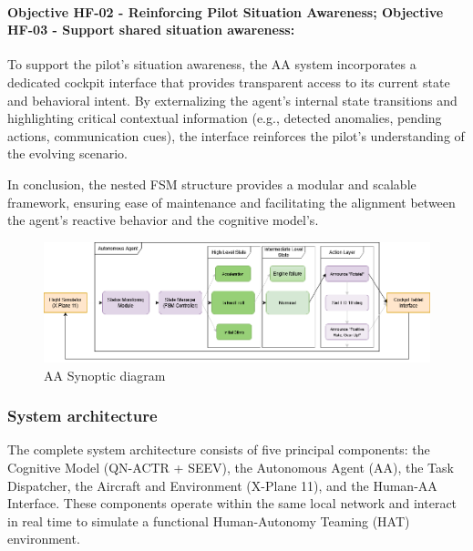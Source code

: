 \documentclass[12pt,a4paper]{article} %
\begin{document}
	\paragraph{Objective HF-02 - Reinforcing Pilot Situation Awareness; Objective HF-03 - Support shared situation awareness:}  
	To support the pilot's situation awareness, the AA system incorporates a dedicated cockpit interface that provides transparent access to its current state and behavioral intent. By externalizing the agent's internal state transitions and highlighting critical contextual information (e.g., detected anomalies, pending actions, communication cues), the interface reinforces the pilot's understanding of the evolving scenario. 

	In conclusion, the nested FSM structure provides a modular and scalable framework, ensuring ease of maintenance and facilitating the alignment between the agent's reactive behavior and the cognitive model's.

	\begin{figure}[H]
		\centering
		\includegraphics[width=1.0\textwidth]{./images/AA_synoptic.png}
		\caption{AA Synoptic diagram}
		\label{fig:aa_synoptic}
	\end{figure}
	
	\subsubsection{System architecture}
	The complete system architecture consists of five principal components: the Cognitive Model (QN-ACTR + SEEV), the Autonomous Agent (AA), the Task Dispatcher, the Aircraft and Environment (X-Plane 11), and the Human-AA Interface. These components operate within the same local network and interact in real time to simulate a functional Human-Autonomy Teaming (HAT) environment.
	
\end{document}
